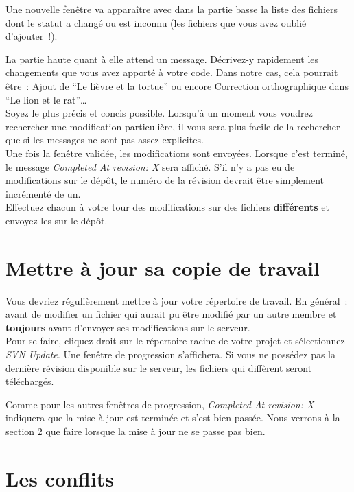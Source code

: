 Une nouvelle fenêtre va apparaître avec dans la partie basse la liste des fichiers dont le statut a changé ou est inconnu (les fichiers que vous avez oublié d'ajouter~!).

La partie haute quant à elle attend un message. Décrivez-y rapidement les changements que vous avez apporté à votre code. Dans notre cas, cela pourrait être~: \og Ajout de ``Le lièvre et la tortue''\fg{} ou encore \og Correction orthographique dans ``Le lion et le rat''\fg\ldots\\

Soyez le plus précis et concis possible. Lorsqu'à un moment vous voudrez rechercher une modification particulière, il vous sera plus facile de la rechercher que si les messages ne sont pas assez explicites.\\

Une fois la fenêtre validée, les modifications sont envoyées. Lorsque c'est terminé, le message \emph{Completed At revision: X} sera affiché. S'il n'y a pas eu de modifications sur le dépôt, le numéro de la révision devrait être simplement incrémenté de un.\\

Effectuez chacun à votre tour des modifications sur des fichiers \textbf{différents} et envoyez-les sur le dépôt.


\section{Mettre à jour sa copie de travail}

Vous devriez régulièrement mettre à jour votre répertoire de travail. En général~: avant de modifier un fichier qui aurait pu être modifié par un autre membre et \textbf{toujours} avant d'envoyer ses modifications sur le serveur.\\

Pour se faire, cliquez-droit sur le répertoire racine de votre projet et sélectionnez \emph{SVN Update}. Une fenêtre de progression s'affichera. Si vous ne possédez pas la dernière révision disponible sur le serveur, les fichiers qui diffèrent seront téléchargés.

Comme pour les autres fenêtres de progression, \emph{Completed At revision: X} indiquera que la mise à jour est terminée et s'est bien passée. Nous verrons à la section \ref{sec:conflits} que faire lorsque la mise à jour ne se passe pas bien.


\section{Les conflits}
\label{sec:conflits}

